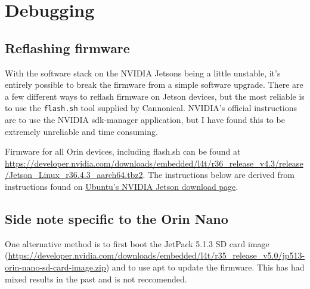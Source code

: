 \documentclass[11pt]{article}
\begin{document}
\section{Debugging}

\subsection{Reflashing firmware}
\label{sec:debug-reflash_firmware}

With the software stack on the NVIDIA Jetsons being a little unstable, it's entirely possible to break the firmware from a simple software upgrade. There are a few different ways to reflash firmware on Jetson devices, but the  most reliable is to use the \texttt{flash.sh} tool supplied by Cannonical. NVIDIA's official instructions are to use the NVIDIA sdk-manager application, but I have found this to be extremely unreliable and time consuming.

Firmware for all Orin devices, including flash.sh can be found at \href{https://developer.nvidia.com/downloads/embedded/l4t/r36_release_v4.3/release/Jetson_Linux_r36.4.3_aarch64.tbz2}{https://developer.nvidia.com/downloads/embedded/l4t/r36\_release\_v4.3/release/Jetson\_Linux\_r36.4.3\_aarch64.tbz2}. The instructions below are derived from instructions found on \href{https://ubuntu.com/download/nvidia-jetson}{Ubuntu's NVIDIA Jetson download page}.

\subsection*{Side note specific to the Orin Nano}

One alternative method is to first boot the JetPack 5.1.3 SD card image (\href{https://developer.nvidia.com/downloads/embedded/l4t/r35_release_v5.0/jp513-orin-nano-sd-card-image.zip}{https://developer.nvidia.com/downloads/embedded/l4t/r35\_release\_v5.0/jp513-orin-nano-sd-card-image.zip}) and to use apt to update the firmware. This has had mixed results in the past and is not reccomended.

\printbibliography
\end{document}
